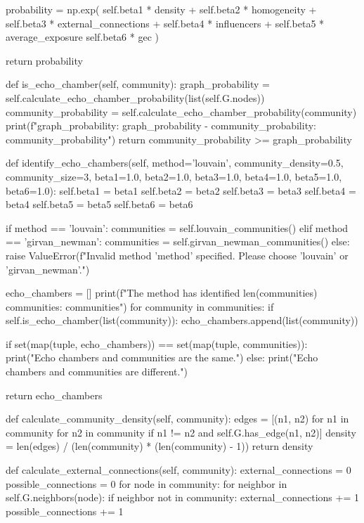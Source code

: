 \begin{codigo}[caption={Exemplo de classe Python para deteção de câmaras de eco}, label={codigo:echochamberdetector}, language=Python, breaklines=true]
        probability = np.exp(
            self.beta1 * density +
            self.beta2 * homogeneity +
            self.beta3 * external_connections +
            self.beta4 * influencers +
            self.beta5 * average_exposure  
            self.beta6 * gec  
        )

        return probability

    def is_echo_chamber(self, community):
        graph_probability = self.calculate_echo_chamber_probability(list(self.G.nodes))
        community_probability = self.calculate_echo_chamber_probability(community)
        print(f"graph_probability: {graph_probability} - community_probability: {community_probability}")
        return community_probability >= graph_probability

    def identify_echo_chambers(self, method='louvain', community_density=0.5, community_size=3,
                               beta1=1.0, beta2=1.0, beta3=1.0, beta4=1.0, beta5=1.0, beta6=1.0):
        self.beta1 = beta1
        self.beta2 = beta2
        self.beta3 = beta3
        self.beta4 = beta4
        self.beta5 = beta5
        self.beta6 = beta6

        if method == 'louvain':
            communities = self.louvain_communities()
        elif method == 'girvan_newman':
            communities = self.girvan_newman_communities()
        else:
            raise ValueError(f"Invalid method '{method}' specified. Please choose 'louvain' or 'girvan_newman'.")

        echo_chambers = []
        print(f"The {method} has identified {len(communities)} communities: {communities}")
        for community in communities:
          if self.is_echo_chamber(list(community)):
              echo_chambers.append(list(community))

        if set(map(tuple, echo_chambers)) == set(map(tuple, communities)):
            print("Echo chambers and communities are the same.")
        else:
            print("Echo chambers and communities are different.")

        return echo_chambers

    def calculate_community_density(self, community):
        edges = [(n1, n2) for n1 in community for n2 in community if n1 != n2 and self.G.has_edge(n1, n2)]
        density = len(edges) / (len(community) * (len(community) - 1))
        return density

    def calculate_external_connections(self, community):
      external_connections = 0
      possible_connections = 0
      for node in community:
          for neighbor in self.G.neighbors(node):
              if neighbor not in community:
                  external_connections += 1
              possible_connections += 1


\end{codigo}
